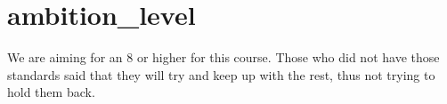 \section{ambition\_level}

We are aiming for an 8 or higher for this course.
Those who did not have those standards said that they will try and keep up with the rest, thus not trying to hold them back.

